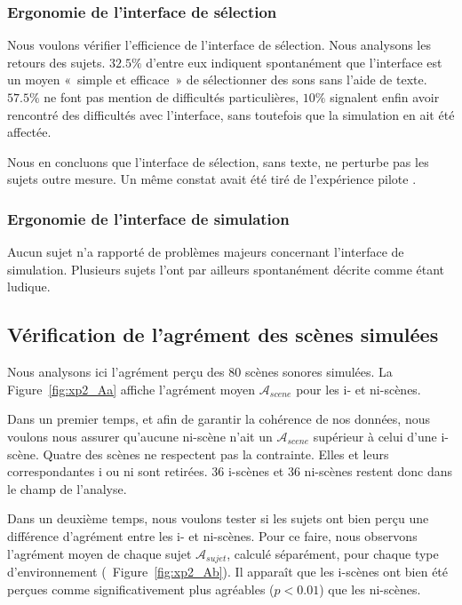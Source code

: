\subsubsection{Ergonomie de l'interface de sélection}

Nous voulons vérifier l'efficience de l'interface de sélection. Nous analysons les retours des sujets. $32.5\%$ d'entre eux indiquent spontanément que l'interface est un moyen «~simple et efficace~» de sélectionner des sons sans l'aide de texte. $57.5\%$ ne font pas mention de difficultés particulières, $10\%$ signalent enfin avoir rencontré des difficultés avec l'interface, sans toutefois que la simulation en ait été affectée.

Nous en concluons que l'interface de sélection, sans texte, ne perturbe pas les sujets outre mesure. Un même constat avait été tiré de l'expérience pilote \citep{lafay2013atiam,lafay2014new}. 

\subsubsection{Ergonomie de l'interface de simulation}

Aucun sujet n'a rapporté de problèmes majeurs concernant l'interface de simulation. Plusieurs sujets l'ont par ailleurs spontanément décrite comme étant ludique.

\subsection{Vérification de l'agrément des scènes simulées}

Nous analysons ici l'agrément perçu des $80$ scènes sonores simulées. La Figure~\ref{fig:xp2_Aa} affiche l'agrément moyen $\mathcal{A}_{scene}$ pour les i- et ni-scènes. 

Dans un premier temps, et afin de garantir la cohérence de nos données, nous voulons nous assurer qu'aucune ni-scène n'ait un $\mathcal{A}_{scene}$ supérieur à celui d'une i-scène. Quatre des scènes ne respectent pas la contrainte. Elles et leurs correspondantes i ou ni sont retirées. 36 i-scènes et 36 ni-scènes restent donc dans le champ de l'analyse.

Dans un deuxième temps, nous voulons tester si les sujets ont bien perçu une différence d'agrément entre les i- et ni-scènes. Pour ce faire, nous observons l'agrément moyen de chaque sujet $\mathcal{A}_{sujet}$, calculé séparément, pour chaque type d'environnement (\cf~Figure~\ref{fig:xp2_Ab}). Il apparaît que les i-scènes ont bien été perçues comme significativement plus agréables ($p<0.01$) que les ni-scènes.

